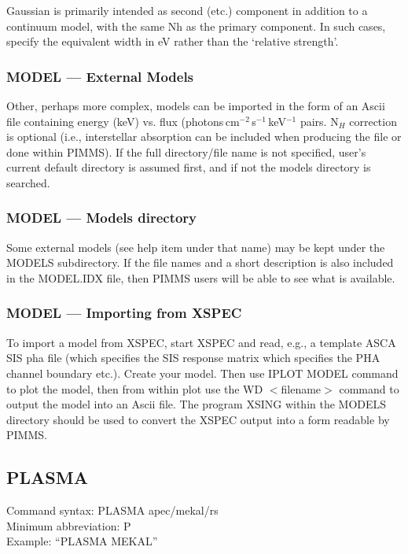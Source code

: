 \documentclass[11pt]{article}
\begin{document}
\begin{appendices}
Gaussian is primarily intended as second (etc.) component in addition to a
continuum model, with the same Nh as the primary component.  In such cases,
specify the equivalent width in eV rather than the `relative strength'.

\subsubsection{MODEL --- External Models}

Other, perhaps more complex, models can be  imported in the form of an Ascii
file containing energy  (keV) vs. flux (photons\,cm$^{-2}$\,s$^{-1}$\,keV$^{-1}$
pairs.    N$_H$
correction is  optional  (i.e., interstellar absorption can be included when
producing the file or done within PIMMS). If the full directory/file name is
not specified, user's current default directory is assumed first, and if not
the models directory is searched.

\subsubsection{MODEL --- Models directory}

Some external models (see help item under that name) may be kept under the
MODELS subdirectory.   If the file names  and a short description  is also
included in the MODEL.IDX file,  then PIMMS users will be able to see what
is available.

\subsubsection{MODEL --- Importing from XSPEC}

To import a model from XSPEC, start XSPEC and read, e.g., a template ASCA
SIS pha file (which specifies the SIS response matrix which specifies the
PHA channel  boundary etc.).    Create your model.   Then use IPLOT MODEL
command to plot  the model,  then from within plot  use the WD $<$filename$>$
command to output the model into an Ascii file.  The program XSING within
the MODELS directory  should be used  to convert the  XSPEC output into a
form readable by PIMMS.

\subsection{PLASMA}

Command syntax: PLASMA apec/mekal/rs \\
Minimum abbreviation: P \\
Example: ``PLASMA MEKAL'' \\
\vspace{0.5 cm}


\end{appendices}
\end{document}
